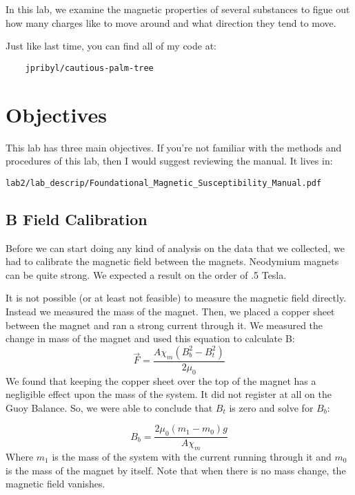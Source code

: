 \documentclass{article}
\begin{document}
In this lab, we examine the magnetic properties of several substances to figue
out how many charges like to move around and what direction they tend to move.

Just like last time, you can find all of my code at:
\begin{verbatim}
    jpribyl/cautious-palm-tree
\end{verbatim}

\section{Objectives}

This lab has three main objectives. If you're not familiar with the methods and
procedures of this lab, then I would suggest reviewing the manual. It lives in:

\begin{verbatim}
lab2/lab_descrip/Foundational_Magnetic_Susceptibility_Manual.pdf
\end{verbatim}

\subsection{B Field Calibration}
Before we can start doing any kind of analysis on the data that we collected,
we had to calibrate the magnetic field between the magnets. Neodymium magnets
can be quite strong. We expected a result on the order of .5 Tesla. 

It is not possible (or at least not feasible) to measure the magnetic field
directly. Instead we measured the mass of the magnet. Then, we placed a copper
sheet between the magnet and ran a strong current through it. We measured the
change in mass of the magnet and used this equation to calculate B:
$$\vec{F} = \frac{A \chi_m (B_{b}^{2} - B_{t}^{2})}{2 \mu_0}$$
We found that keeping the copper sheet over the top of the magnet has a
negligible effect upon the mass of the system. It did not register at all on
the Guoy Balance. So, we were able to conclude that $B_t$ is zero and solve for
$B_b$:

$$B_b = \frac{2 \mu_0 (m_1 - m_0) g}{A \chi_m}$$
Where $m_1$ is the mass of the system with the current running through it and
$m_0$ is the mass of the magnet by itself. Note that when there is no mass
change, the magnetic field vanishes.
\end{document}
